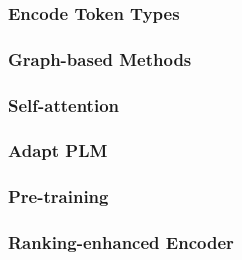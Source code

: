 \subsubsection{Encode Token Types}

\subsubsection{Graph-based Methods}

\subsubsection{Self-attention}

\subsubsection{Adapt PLM} %

\subsubsection{Pre-training}

\subsubsection{Ranking-enhanced Encoder}

